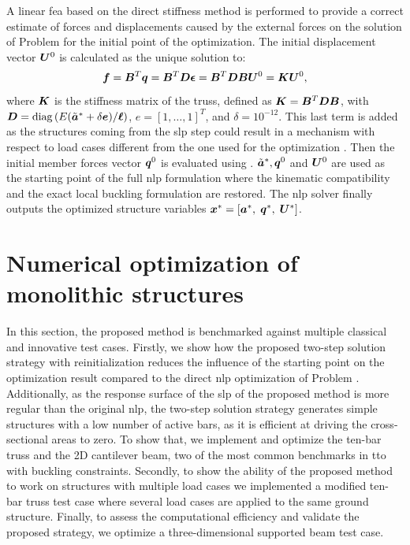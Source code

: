 A linear \gls{fea} based on the direct stiffness method is performed to provide a correct estimate of forces and displacements caused by the external forces on the solution of Problem  for the initial point of the optimization. The initial displacement vector $\bm{U}^0$ is calculated as the unique solution to:
\begin{equation}
    \bm{f}=\bm{B}^T \bm{q}=\bm{B}^{T} \bm{D} \bm{\epsilon}=\bm{B}^{T} \bm{D} \bm{B} \bm{U}^0=\bm{K} \bm{U}^0,
    \label{eq:04_truss_fem}
\end{equation} 
 where $\bm{K}$ is the stiffness matrix of the truss, defined as $\bm{K}=\bm{B}^{T} \bm{D} \bm{B}$, with $\bm{D}=\operatorname{diag}\left(E (\tilde{\bm{a}}^* + \delta \bm{e}) / \bm{\ell}\right)$, $e =[1,\dots,1]^T$, and $\delta =10^{-12}$. This last term is added as the structures coming from the \gls{slp} step could result in a mechanism with respect to load cases different from the one used for the optimization . Then the initial member forces vector $\bm{q}^0$ is evaluated using . $\tilde{\bm{a}}^*, \bm{q}^0$ and $\bm{U}^0$ are used as the starting point of the full \gls{nlp} formulation where the kinematic compatibility and the exact local buckling formulation are restored. The \gls{nlp} solver finally outputs the optimized structure variables $\bm{x}^*=[\bm{a}^*,\; \bm{q}^*,\; \bm{U}^*]$.

\section{Numerical optimization of monolithic structures} \label{sec:04_numerical_app}
In this section, the proposed method is benchmarked against multiple classical and innovative test cases. Firstly, we show how the proposed two-step solution strategy with reinitialization reduces the influence of the starting point on the optimization result compared to the direct \gls{nlp} optimization of Problem . Additionally, as the response surface of the \gls{slp} of the proposed method is more regular than the original \gls{nlp}, the two-step solution strategy generates simple structures \ie with a low number of active bars, as it is efficient at driving the cross-sectional areas to zero. To show that, we implement and optimize the ten-bar truss and the 2D cantilever beam, two of the most common benchmarks in \gls{tto} with buckling constraints. Secondly, to show the ability of the proposed method to work on structures with multiple load cases we implemented a modified ten-bar truss test case where several load cases are applied to the same ground structure. Finally, to assess the computational efficiency and validate the proposed strategy, we optimize a three-dimensional supported beam test case.

